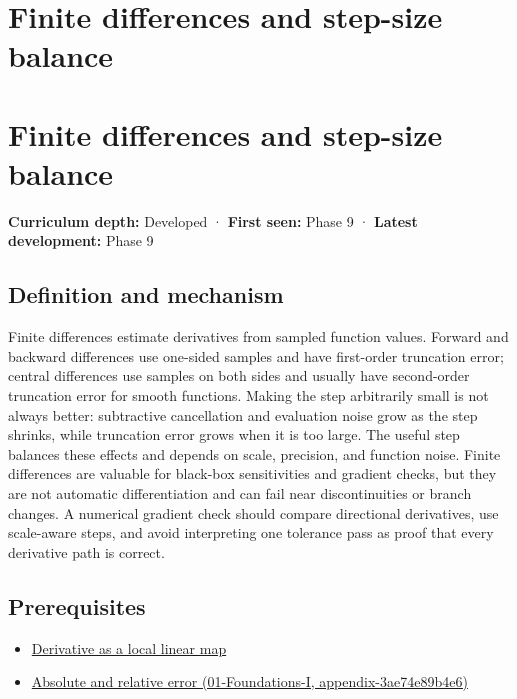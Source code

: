 \hypertarget{appendix-e2d7b4f2161d}{}
\section*{Finite differences and step-size balance}
\section{Finite differences and step-size balance}\label{appendix-e2d7b4f2161d-finite-differences-and-step-size-balance}

\textbf{Curriculum depth:} Developed · \textbf{First seen:} Phase 9 · \textbf{Latest development:} Phase 9

\subsection{Definition and mechanism}\label{appendix-e2d7b4f2161d-definition-and-mechanism}

Finite differences estimate derivatives from sampled function values. Forward and backward differences use one-sided samples and have first-order truncation error; central differences use samples on both sides and usually have second-order truncation error for smooth functions. Making the step arbitrarily small is not always better: subtractive cancellation and evaluation noise grow as the step shrinks, while truncation error grows when it is too large. The useful step balances these effects and depends on scale, precision, and function noise. Finite differences are valuable for black-box sensitivities and gradient checks, but they are not automatic differentiation and can fail near discontinuities or branch changes. A numerical gradient check should compare directional derivatives, use scale-aware steps, and avoid interpreting one tolerance pass as proof that every derivative path is correct.

\subsection{Prerequisites}\label{appendix-e2d7b4f2161d-prerequisites}

\begin{itemize}
\tightlist
\item
  \hyperref[appendix-7bc181935c42]{Derivative as a local linear map}
\item
  \href{../01-Foundations-I/main.pdf\#nameddest=appendix-3ae74e89b4e6}{Absolute and relative error (01-Foundations-I, appendix-3ae74e89b4e6)}
\end{itemize}

